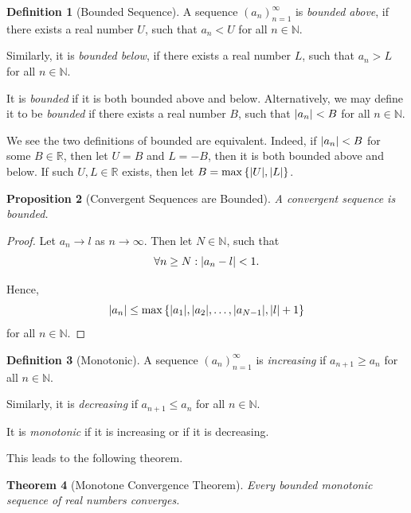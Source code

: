 \documentclass{article}
\newtheorem{theorem}{Theorem}[section]
\newtheorem{proposition}[theorem]{Proposition}
\theoremstyle{definition}
\newtheorem{definition}[theorem]{Definition}
\theoremstyle{remark}
\DeclarePairedDelimiter{\abs}{\lvert}{\rvert}
\newcommand{\pqty}[1]{\left(#1\right)}
\newcommand{\Bqty}[1]{\left\{#1\right\}}
\newcommand{\NN}{\mathbb{N}}
\newcommand{\RR}{\mathbb{R}}
\begin{document}
\begin{definition}[Bounded Sequence]
    A sequence \(\pqty{a_n}_{n = 1}^{\infty}\) is \emph{bounded above}, if there exists a real number \(U\), such that \(a_n < U\) for all \(n \in \NN\).

    Similarly, it is \emph{bounded below}, if there exists a real number \(L\), such that \(a_n > L\) for all \(n \in \NN\).

    It is \emph{bounded} if it is both bounded above and below. Alternatively, we may define it to be \emph{bounded} if there exists a real number \(B\), such that \(\abs{a_n} < B\) for all \(n \in \NN\).
\end{definition}

We see the two definitions of bounded are equivalent. Indeed, if \(\abs{a_n} < B\) for some \(B \in \RR\), then let \(U = B\) and \(L = -B\), then it is both bounded above and below. If such \(U, L \in \RR\) exists, then let \(B = \max\Bqty{\abs{U}, \abs{L}}\).

\begin{proposition}[Convergent Sequences are Bounded]
    A convergent sequence is bounded.
\end{proposition}

\begin{proof}
    Let \(a_n \to l\) as \(n \to \infty\). Then let \(N \in \NN\), such that
    \[
        \forall n \geq N: \abs{a_n - l} < 1.
    \]

    Hence,
    \[
        \abs{a_n} \leq \max\Bqty{\abs{a_1}, \abs{a_2}, \ldots, \abs{a_{N - 1}}, \abs{l} + 1}
    \]
    for all \(n \in \NN\).
\end{proof}

\begin{definition}[Monotonic]
    A sequence \(\pqty{a_n}_{n = 1}^{\infty}\) is \emph{increasing} if \(a_{n + 1} \geq a_n\) for all \(n \in \NN\).

    Similarly, it is \emph{decreasing} if \(a_{n + 1} \leq a_n\) for all \(n \in \NN\).

    It is \emph{monotonic} if it is increasing or if it is decreasing.
\end{definition}

This leads to the following theorem.

\begin{theorem}[Monotone Convergence Theorem]
    Every bounded monotonic sequence of real numbers converges.
\end{theorem}
\end{document}
